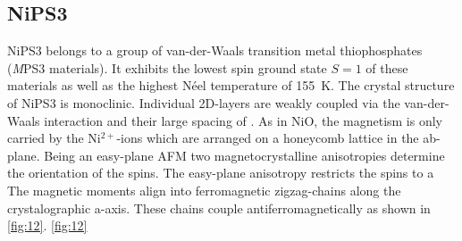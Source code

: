\subsection{NiPS3}
NiPS3 belongs to a group of van-der-Waals transition metal thiophosphates (\textit{M}PS3 materials).
It exhibits the lowest spin ground state $S=1$ of these materials as well as the highest Néel temperature of \qty{155}{K}.
The crystal structure of NiPS3 is monoclinic.
Individual 2D-layers are weakly coupled via the van-der-Waals interaction and their large spacing of  \cite{afanasiev_controlling_2021}.
As in NiO, the magnetism is only carried by the Ni$^{2+}$-ions which are arranged on a honeycomb lattice in the ab-plane.
Being an easy-plane AFM two magnetocrystalline anisotropies determine the orientation of the spins.
The easy-plane anisotropy restricts the spins to a 
The magnetic moments align into ferromagnetic zigzag-chains along the crystalographic a-axis.
These chains couple antiferromagnetically as shown in \autoref{fig:12}.
\autoref{fig:12}

